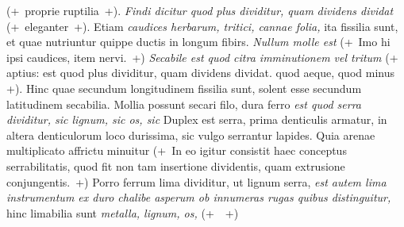 (+~proprie ruptilia~+).
\textit{Findi dicitur quod plus dividitur, quam} \textit{ dividens dividat} (+~eleganter~+). Etiam \textit{caudices herbarum\protect{}, tritici\protect{}, cannae folia\protect{},} ita fissilia sunt, et quae nutriuntur quippe ductis in longum fibirs. \textit{Nullum molle est }
(+~Imo hi ipsi caudices\protect{}, item nervi.~+)
\textit{Secabile est quod citra imminutionem vel tritum
} (+ aptius:  est quod plus dividitur, quam dividens dividat.
 quod aeque,
 quod minus +). Hinc quae secundum longitudinem fissilia\protect{} sunt, solent esse secundum latitudinem secabilia. Mollia possunt secari filo, dura ferro %
\textit{ est quod serra dividitur, sic lignum, sic os, sic } Duplex est serra, prima denticulis armatur, in altera denticulorum loco  durissima, sic vulgo serrantur lapides. Quia arenae\protect{} multiplicato affrictu minuitur 
(+~In eo igitur consistit haec
conceptus serrabilitatis,\protect{}
quod fit non tam insertione dividentis, quam extrusione conjungentis.~+)
Porro ferrum lima dividitur, ut lignum serra,
\textit{est autem lima instrumentum ex duro chalibe asperum ob innumeras rugas quibus distinguitur,}
hinc limabilia sunt \textit{metalla, lignum, os,\protect{}
}
(+~~+)
